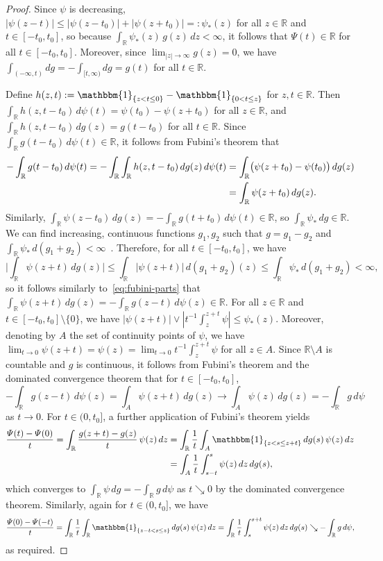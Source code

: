 \documentclass[a4paper]{article}
\newcommand{\R}{\mathbb{R}}
\newcommand{\Ind}{\mathbbm{1}}
\theoremstyle{definition}
\begin{document}
\begin{proof}
Since $\psi$ is decreasing, $|\psi(z - t)| \leq |\psi(z - t_0)| + |\psi(z + t_0)| =: \psi_*(z)$ for all $z \in \R$ and $t \in [-t_0,t_0]$, so because $\int_\R \psi_*(z)\,g(z)\,dz < \infty$, it follows that $\varPsi(t) \in \R$ for all $t \in [-t_0,t_0]$. Moreover, since $\lim_{|z| \to \infty} g(z) = 0$, we have $\int_{(-\infty,t)}dg = -\int_{[t,\infty)}dg = g(t)$ for all $t \in \R$. 

Define $h(z,t) := \Ind_{\{z < t \leq 0\}} - \Ind_{\{0 < t \leq z\}}$ for $z,t \in \R$. Then $\int_\R h(z, t - t_0)\,d\psi(t) = \psi(t_0) - \psi(z + t_0)$ for all $z \in \R$, and $\int_\R h(z, t - t_0)\,dg(z) = g(t - t_0)$ for all $t \in \R$. Since $\int_\R g(t - t_0)\,d\psi(t) \in \R$, it follows from Fubini's theorem that
\begin{align}
-\int_\R g(t - t_0)\,d\psi(t) = -\int_\R \int_\R h(z, t - t_0)\,dg(z)\,d\psi(t) &= \int_\R \bigl(\psi(z + t_0) - \psi(t_0)\bigr)\,dg(z) \notag \\
\label{eq:fubini-parts}
&= \int_\R \psi(z + t_0)\,dg(z).
\end{align}
Similarly, $\int_\R\psi(z - t_0)\,dg(z) = -\int_\R g(t + t_0)\,d\psi(t) \in \R$, so $\int_\R \psi_*\,dg \in \R$. We can find increasing, continuous functions $g_1,g_2$ such that $g = g_1 - g_2$ and $\int_\R \psi_*\,d(g_1 + g_2) < \infty$~\citep[e.g.][p.~94 and 103--104]{folland1999real}. 
Therefore, for all $t \in [-t_0,t_0]$, we have
\[
\biggl|\int_\R \psi(z + t)\,dg(z)\biggr| \leq \int_\R |\psi(z + t)|\,d(g_1 + g_2)(z) \leq \int_\R \psi_*\,d(g_1 + g_2) < \infty,
\]
so it follows similarly to~\eqref{eq:fubini-parts} that $\int_\R \psi(z + t)\,dg(z) = -\int_\R g(z - t)\,d\psi(z) \in  \R$. For all $z \in \R$ and $t \in [-t_0,t_0] \setminus \{0\}$, we have $|\psi(z + t)| \vee |t^{-1}\int_z^{z + t} \psi| \leq \psi_*(z)$. Moreover, denoting by $A$ the set of continuity points of $\psi$, we have $\lim_{t \to 0} \psi(z + t) = \psi(z) = \lim_{t \to 0} t^{-1}\int_z^{z + t} \psi$ for all $z \in A$. Since $\R \setminus A$ is countable and $g$ is continuous, it follows from Fubini's theorem and the dominated convergence theorem that for $t \in [-t_0,t_0]$,
\[
-\int_\R g(z - t)\,d\psi(z) = \int_A \psi(z + t)\,dg(z) \to \int_A \psi(z)\,dg(z) = -\int_\R g\,d\psi
\]
as $t \to 0$. For $t \in (0, t_0]$, a further application of Fubini's theorem yields
\begin{align*}
\frac{\varPsi(t) - \varPsi(0)}{t} = \int_\R\frac{g(z + t) - g(z)}{t}\,\psi(z)\,dz &= \int_\R \frac{1}{t}\int_A \Ind_{\{z < s \leq z + t\}}\,dg(s)\,\psi(z)\,dz \\
&= \int_A \frac{1}{t}\int_{s - t}^s \psi(z)\,dz\,dg(s),
\end{align*}
which converges to $\int_\R \psi\,dg = -\int_\R g\,d\psi$ as $t \searrow 0$ by the dominated convergence theorem. Similarly, again for $t \in (0,t_0]$, we have
\[
\frac{\varPsi(0) - \varPsi(-t)}{t} = \int_\R \frac{1}{t}\int_\R \Ind_{\{z - t < s \leq z\}}\,dg(s)\,\psi(z)\,dz = \int_\R\frac{1}{t}\int_s^{s + t}\psi(z)\,dz\,dg(s) \searrow -\int_\R g\,d\psi,
\]
as required.
\end{proof}
\end{document}
